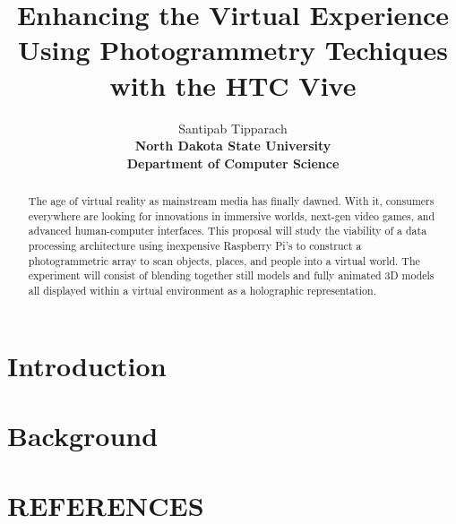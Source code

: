 \documentclass[10pt,a4paper]{article}
\title{\textbf{\Huge Enhancing the Virtual Experience Using Photogrammetry Techiques\\
		\Large with the HTC Vive }}
\author{Santipab Tipparach\\
	\textbf{North Dakota State University}\\\textbf{Department of Computer Science}}
\begin{document}
	\maketitle
	
	\begin{abstract}
	The age of virtual reality as mainstream media has finally dawned. With it, consumers everywhere are looking for innovations in immersive worlds, next-gen video games, and advanced human-computer interfaces. This proposal will study the viability of a data processing architecture using inexpensive Raspberry Pi's to construct a photogrammetric array to scan objects, places, and people into a virtual world. The experiment will consist of blending together still models and fully animated 3D models all displayed within a virtual environment as a holographic representation.
		
	\end{abstract}
	
	\section{Introduction}

	
	\section{Background}
	

\cite{Shinozuka}

	\section*{REFERENCES}
	\begin{thebibliography}{99}
		
		
	\end{thebibliography}
\end{document}
